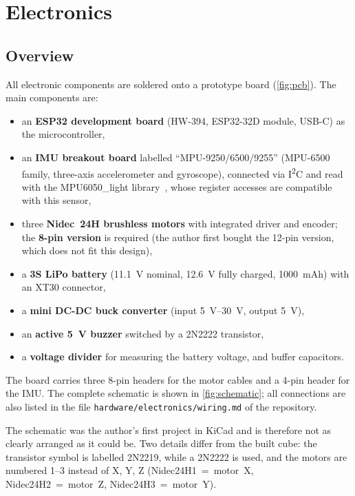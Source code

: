 \chapter{Electronics}
\label{ch:electronics}

\section{Overview}

All electronic components are soldered onto a  prototype board
(\cref{fig:pcb}). The main components are:
\begin{itemize}
  \item an \textbf{ESP32 development board} (HW-394, ESP32-32D module, USB-C) as the
        microcontroller,
  \item an \textbf{IMU breakout board} labelled \enquote{MPU-9250/6500/9255} (MPU-6500 family,
        three-axis accelerometer and gyroscope), connected via I\textsuperscript{2}C and read with
        the MPU6050\_light library~\cite{mpu6050light}, whose register accesses are compatible
        with this sensor,
  \item three \textbf{Nidec~24H brushless motors} with integrated driver and encoder; the
        \textbf{8-pin version} is required (the author first bought the 12-pin version, which does
        not fit this design),
  \item a \textbf{3S LiPo battery} (\SI{11.1}{V} nominal, \SI{12.6}{V} fully charged,
        \SI{1000}{mAh}) with an XT30 connector,
  \item a \textbf{mini DC-DC buck converter} (input \SIrange{5}{30}{V}, output \SI{5}{V}),
  \item an \textbf{active \SI{5}{V} buzzer} switched by a 2N2222 transistor,
  \item a \textbf{voltage divider} for measuring the battery voltage, and buffer capacitors.
\end{itemize}
The board carries three 8-pin headers for the motor cables and a 4-pin header for the IMU.
The complete schematic is shown in \cref{fig:schematic}; all connections are also listed in the
file \nolinkurl{hardware/electronics/wiring.md} of the repository.

The schematic was the author's first project in KiCad and is therefore not as clearly arranged as
it could be. Two details differ from the built cube: the transistor symbol is labelled 2N2219,
while a 2N2222 is used, and the motors are numbered 1--3 instead of X, Y, Z
(Nidec24H1~=~motor~X, Nidec24H2~=~motor~Z, Nidec24H3~=~motor~Y).

